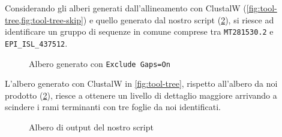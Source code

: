 \documentclass[11pt,italian]{article}
\begin{document}
\noindent
Considerando gli alberi generati dall'allineamento con ClustalW (\cref{fig:tool-tree,fig:tool-tree-skip}) e quello generato dal nostro script (\cref{fig:script-tree}), si riesce ad identificare un gruppo di sequenze in comune comprese tra \lstinline{MT281530.2} e \lstinline{EPI_ISL_437512}.


\begin{figure}[H]
  \caption{Albero generato con \lstinline{Exclude Gaps=On}}
  \label{fig:tool-tree-skip}
\end{figure}
L'albero generato con ClustalW in \cref{fig:tool-tree}, rispetto all'albero da noi prodotto (\cref{fig:script-tree}), riesce a ottenere un livello di dettaglio maggiore arrivando a scindere i rami terminanti con tre foglie da noi identificati.

\begin{figure}[H]
  \caption{Albero di output del nostro script}
  \label{fig:script-tree}
\end{figure}
\end{document}
